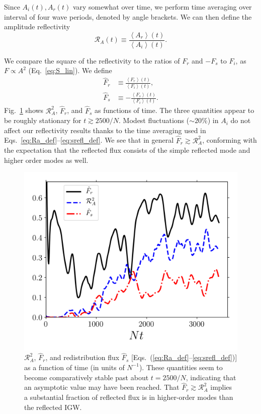 \documentclass[
        fleqn,
        usenatbib,
    ]{mnras}
\newcommand*{\ev}[1]{\left\langle#1\right\rangle}
\begin{document}
Since $A_i(t), A_r(t)$ vary somewhat over time, we perform time averaging over
interval of four wave periods, denoted by angle brackets. We can then define the
amplitude reflectivity
\begin{equation}
    \mathcal{R}_A(t) \equiv \frac{\ev{A_r}(t)}{\ev{A_i}(t)}
        .\label{eq:Ra_def}
\end{equation}

We compare the square of the reflectivity to the ratios of $F_r$ and $-F_s$ to
$F_i$, as $F \propto A^2$ (Eq.~\eqref{eq:S_lin}). We define
\begin{align}
    \hat{F}_r &\equiv \frac{\ev{F_r}(t)}{\ev{F_i}(t)}, \label{eq:srefl_def1}\\
    \hat{F}_s &\equiv -\frac{\ev{F_s}(t)}{\ev{F_i}(t)}. \label{eq:srefl_def}
\end{align}
Fig.~\ref{fig:nl_f_refl} shows $\mathcal{R}_A^2$, $\hat{F}_r$, and $\hat{F}_s$
as functions of time. The three quantities appear to be roughly stationary for
$t \gtrsim 2500/N$. Modest fluctuations ($\sim 20\%$) in $A_i$ do not affect our
reflectivity results thanks to the time averaging used in
Eqs.~\eqref{eq:Ra_def}--\eqref{eq:srefl_def}.%
We see that in general $\hat{F}_r \gtrsim \mathcal{R}_A^2$, conforming with the
expectation that the reflected flux consists of the simple reflected mode and
higher order modes as well.
\begin{figure}
    \centering
    \includegraphics[width=0.9\columnwidth]{plots/nl_f_refl.png}
    \caption{$\mathcal{R}_A^2$, $\hat{F}_r$, and redistribution flux $\hat{F}_s$
    [Eqs.~(\ref{eq:Ra_def}--\ref{eq:srefl_def})] as a function of time (in
    units of $N^{-1}$). These quantities seem to become comparatively stable
    past about $t = 2500/N$, indicating that an asymptotic value may have been
    reached. That $\hat{F}_r \gtrsim \mathcal{R}_A^2$ implies a substantial
    fraction of reflected flux is in higher-order modes than the reflected
    IGW.}\label{fig:nl_f_refl}
\end{figure}
\end{document}
